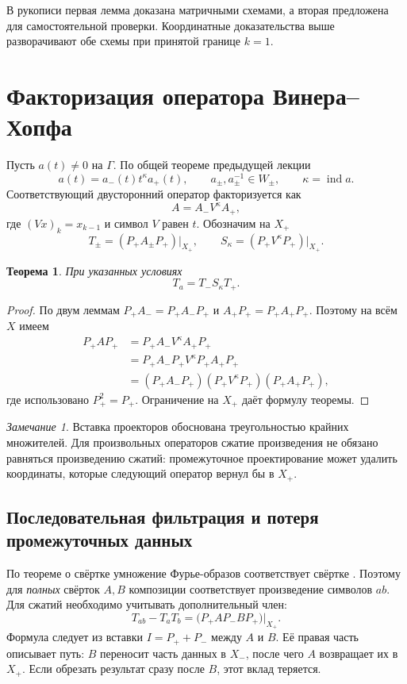 \documentclass[12pt,a4paper]{article}
\newtheorem{theorem}{Теорема}
\theoremstyle{definition}
\theoremstyle{remark}
\newtheorem*{remark}{Замечание}
\DeclareMathOperator{\ind}{ind}
\begin{document}
В рукописи первая лемма доказана матричными схемами, а вторая
предложена для самостоятельной проверки. Координатные доказательства
выше разворачивают обе схемы при принятой границе $k=1$.

\section{Факторизация оператора Винера--Хопфа}

Пусть $a(t)\ne0$ на $\Gamma$. По общей теореме предыдущей лекции
\[
  a(t)=a_-(t)t^\kappa a_+(t),\qquad
  a_\pm,a_\pm^{-1}\in W_\pm,\qquad \kappa=\ind a.
\]
Соответствующий двусторонний оператор факторизуется как
\[
  A=A_-V^\kappa A_+,
\]
где $(Vx)_k=x_{k-1}$ и символ $V$ равен $t$.
Обозначим на $X_+$
\[
  T_\pm=(P_+A_\pm P_+)\big|_{X_+},\qquad
  S_\kappa=(P_+V^\kappa P_+)\big|_{X_+}.
\]

\begin{theorem}
При указанных условиях
\[
  \boxed{T_a=T_-S_\kappa T_+}.
\]
\end{theorem}

\begin{proof}
По двум леммам $P_+A_-=P_+A_-P_+$ и $A_+P_+=P_+A_+P_+$.
Поэтому на всём $X$ имеем
\begin{align*}
  P_+AP_+
  &=P_+A_-V^\kappa A_+P_+\\
  &=P_+A_-P_+V^\kappa P_+A_+P_+\\
  &=(P_+A_-P_+)(P_+V^\kappa P_+)(P_+A_+P_+),
\end{align*}
где использовано $P_+^2=P_+$. Ограничение на $X_+$ даёт формулу теоремы.
\end{proof}

\begin{remark}
Вставка проекторов обоснована треугольностью крайних множителей.
Для произвольных операторов сжатие произведения не обязано равняться
произведению сжатий: промежуточное проектирование может удалить
координаты, которые следующий оператор вернул бы в $X_+$.
\end{remark}

\subsection*{Последовательная фильтрация и потеря промежуточных данных}

По теореме о свёртке умножение Фурье-образов соответствует свёртке
\cite[\S\,4.6.6, с.~298]{GW2012}. Поэтому для \emph{полных}
свёрток $A,B$ композиции соответствует произведение символов $ab$.
Для сжатий необходимо учитывать дополнительный член:
\[
  \boxed{T_{ab}-T_aT_b
    =\bigl(P_+A P_-B P_+\bigr)\big|_{X_+}}.
\]
Формула следует из вставки $I=P_++P_-$ между $A$ и $B$.
Её правая часть описывает путь: $B$ переносит часть данных
в $X_-$, после чего $A$ возвращает их в $X_+$.
Если обрезать результат сразу после $B$, этот вклад теряется.
\end{document}
